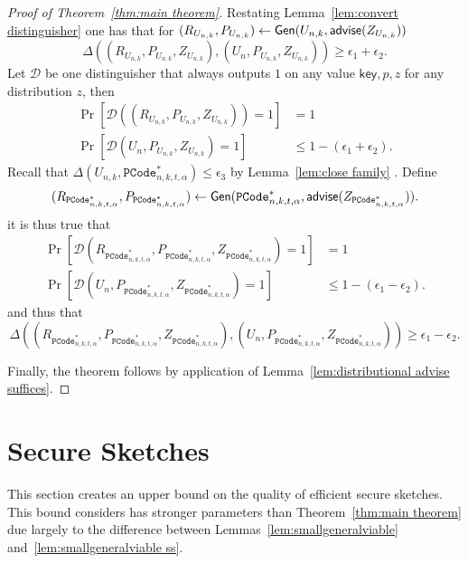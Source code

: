\begin{proof}[Proof of Theorem~\ref{thm:main theorem}]
Restating Lemma~\ref{lem:convert distinguisher} one has that for $(R_{U_{n,k}},P_{U_{n,k}}) \leftarrow {\ensuremath{\mathsf{Gen}}}(U_{n,k}, {\mathsf{advise}}(Z_{U_{n,k}}))$
\[
\Delta((R_{U_{n,k}}, P_{U_{n,k}}, Z_{U_{n,k}}), (U_n, P_{U_{n,k}}, Z_{U_{n,k}}))\ge \epsilon_1+\epsilon_2.
\]
Let $\mathcal{D}$ be one distinguisher that always outputs $1$ on any value $\mathsf{key}, p, z$ for any distribution $z$, then
\begin{align*}
\Pr[\mathcal{D}((R_{U_{n,k}}, P_{U_{n,k}}, Z_{U_{n,k}}))=1] &=1\\
\Pr[\mathcal{D}(U_n, P_{U_{n,k}}, Z_{U_{n,k}})=1]&\le 1-(\epsilon_1+\epsilon_2).
\end{align*}
Recall that $\Delta(U_{n,k}, \mathtt{PCode}_{n, k, t, \alpha}^{*}) \le \epsilon_3$ by Lemma~\ref{lem:close family} .  Define \[(R_{\mathtt{PCode}_{n, k, t, \alpha}^{*}}, P_{\mathtt{PCode}_{n, k, t, \alpha}^{*}})\leftarrow {\ensuremath{\mathsf{Gen}}}(\mathtt{PCode}_{n, k, t, \alpha}^{*}, {\mathsf{advise}}(Z_{\mathtt{PCode}_{n, k, t, \alpha}^{*}})).\]
it is thus true that 
\begin{align*}
\Pr[\mathcal{D}(R_{\mathtt{PCode}_{n, k, t, \alpha}^{*}}, P_{\mathtt{PCode}_{n, k, t, \alpha}^{*}}, Z_{\mathtt{PCode}_{n, k, t, \alpha}^{*}})=1]&=1\\
\Pr[\mathcal{D}(U_n, P_{\mathtt{PCode}_{n, k, t, \alpha}^{*}}, Z_{\mathtt{PCode}_{n, k, t, \alpha}^{*}})=1]&\le 1-(\epsilon_1-\epsilon_2).
\end{align*}
and thus that 
\[
\Delta((R_{\mathtt{PCode}_{n, k, t, \alpha}^{*}}, P_{\mathtt{PCode}_{n, k, t, \alpha}^{*}}, Z_{\mathtt{PCode}_{n, k, t, \alpha}^{*}}), (U_n, P_{\mathtt{PCode}_{n, k, t, \alpha}^{*}}, Z_{\mathtt{PCode}_{n, k, t, \alpha}^{*}}))\ge \epsilon_1-\epsilon_2.
\]

\noindent
Finally, the theorem follows by application of Lemma~\ref{lem:distributional advise suffices}.
\end{proof} 

\section{Secure Sketches}
This section creates an upper bound on the quality of efficient secure sketches.  This bound considers has stronger parameters than Theorem~\ref{thm:main theorem} due largely to the difference between Lemmas~\ref{lem:smallgeneralviable} and~\ref{lem:smallgeneralviable ss}.

